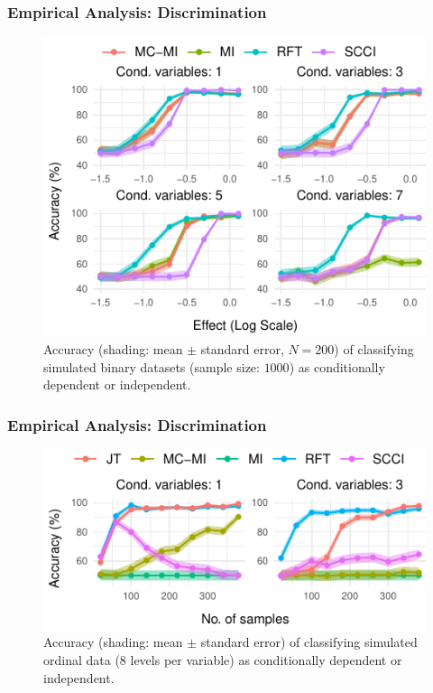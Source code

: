 \documentclass{beamer}
\begin{document}
\begin{frame}
	\frametitle{Empirical Analysis: Discrimination}
	\begin{figure}
		\centering
		\includegraphics{imgs/accuracy.pdf}
		\caption{Accuracy (shading: mean $\pm$ standard error, $N=200$)
		of classifying simulated binary datasets (sample size: $1000$)
		as conditionally dependent or independent.}
	\end{figure}
\end{frame}

\begin{frame}
	\frametitle{Empirical Analysis: Discrimination}
	\begin{figure}
		\centering
		\includegraphics{imgs/accuracy_ordinal.pdf}
		\caption{Accuracy (shading: mean $\pm$ standard error) of
		classifying simulated ordinal data (8 levels per variable) as
		conditionally dependent or independent.}	
	\end{figure}
\end{frame}
\end{document}
